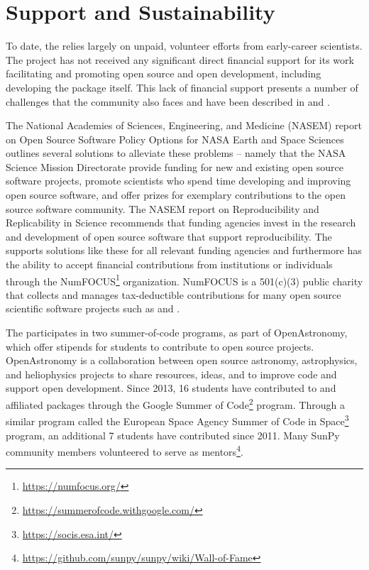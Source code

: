 \section{Support and Sustainability}
\label{sec:support}

To date, the \sunpyproj relies largely on unpaid, volunteer efforts from early-career scientists.
The project has not received any significant direct financial support for its work facilitating and promoting open source and open development, including developing the \sunpypkg package itself.
This lack of financial support presents a number of challenges that the \astropy community also faces and have been described in \cite{PriceWhelan:2018ji} and \cite{Muna2016}.

The National Academies of Sciences, Engineering, and Medicine (NASEM) report on Open Source Software Policy Options for NASA Earth and Space Sciences \citep{NAP2018} outlines several solutions to alleviate these problems -- namely that the NASA Science Mission Directorate provide funding for new and existing open source software projects, promote scientists who spend time developing and improving open source software, and offer prizes for exemplary contributions to the open source software community.
The NASEM report on Reproducibility and Replicability in Science \citep{NAP2019} recommends that funding agencies invest in the research and development of open source software that support reproducibility.
The \sunpyproj supports solutions like these for all relevant funding agencies \citep{nas_sunpy_white_paper} and furthermore has the ability to accept financial contributions from institutions or individuals through the NumFOCUS\footnote{\url{https://numfocus.org/}} organization. NumFOCUS is a 501(c)(3) public charity that collects and manages tax-deductible contributions for many open source scientific software projects such as \numpy and \astropy.

The \sunpyproj participates in two summer-of-code programs, as part of OpenAstronomy, which offer stipends for students to contribute to open source projects.
OpenAstronomy is a collaboration between open source astronomy, astrophysics, and heliophysics projects to share resources, ideas, and to improve code and support open development.
Since 2013, 16 students have contributed to \sunpypkg and affiliated packages through the Google Summer of Code\footnote{\url{https://summerofcode.withgoogle.com/}} program.
Through a similar program called the European Space Agency Summer of Code in Space\footnote{\url{https://socis.esa.int/}} program, an additional 7 students have contributed since 2011.
Many SunPy community members volunteered to serve as mentors\footnote{\url{https://github.com/sunpy/sunpy/wiki/Wall-of-Fame}}.
